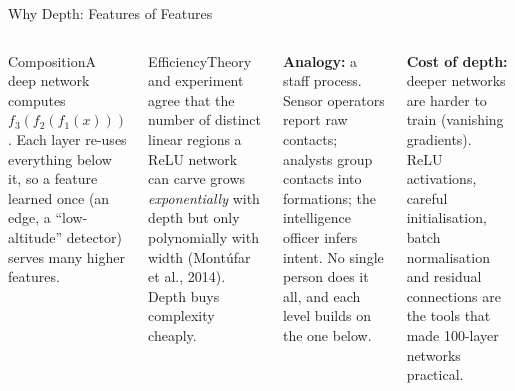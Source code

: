 \documentclass[aspectratio=169,10pt]{beamer}
\begin{document}
\begin{frame}{Why Depth: Features of Features}
\begin{columns}[T]
\begin{cbox}{Composition}\scriptsize A deep network computes $f_3(f_2(f_1(x)))$. Each layer re-uses everything below it, so a feature learned once (an edge, a ``low-altitude'' detector) serves many higher features.\end{cbox}
\begin{cbox}{Efficiency}\scriptsize Theory and experiment agree that the number of distinct linear regions a ReLU network can carve grows \emph{exponentially} with depth but only polynomially with width (Mont\'ufar et al., 2014). Depth buys complexity cheaply.\end{cbox}
\begin{ibox}\scriptsize\textbf{Analogy:} a staff process. Sensor operators report raw contacts; analysts group contacts into formations; the intelligence officer infers intent. No single person does it all, and each level builds on the one below.\end{ibox}
\begin{wbox}\scriptsize\textbf{Cost of depth:} deeper networks are harder to train (vanishing gradients). ReLU activations, careful initialisation, batch normalisation and residual connections are the tools that made 100-layer networks practical.\end{wbox}
\end{columns}
\end{frame}
\end{document}
